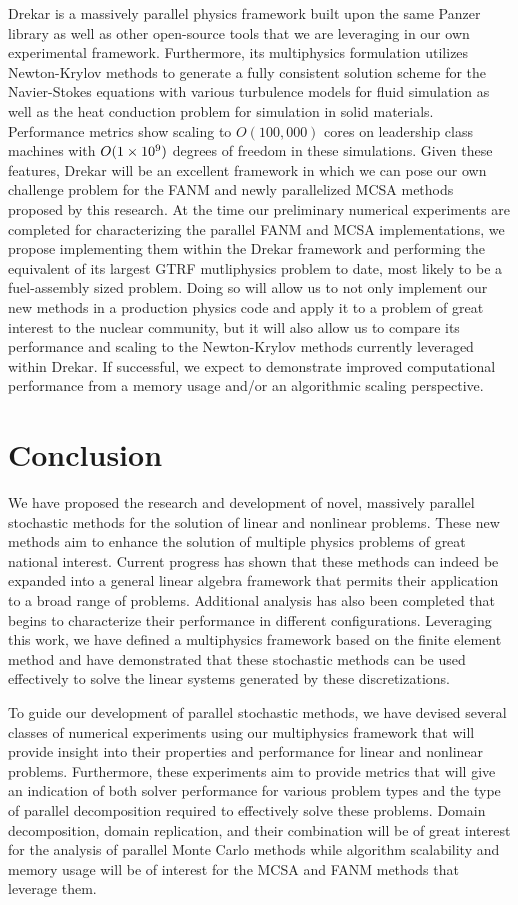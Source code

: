 Drekar is a massively parallel physics framework built upon the same
Panzer library as well as other open-source tools that we are
leveraging in our own experimental framework. Furthermore, its
multiphysics formulation utilizes Newton-Krylov methods to generate a
fully consistent solution scheme for the Navier-Stokes equations with
various turbulence models for fluid simulation as well as the heat
conduction problem for simulation in solid materials. Performance
metrics show scaling to $O(100,000)$ cores on leadership class
machines with $O(1\times 10^{9})$ degrees of freedom in these
simulations. Given these features, Drekar will be an excellent
framework in which we can pose our own challenge problem for the FANM
and newly parallelized MCSA methods proposed by this research. At the
time our preliminary numerical experiments are completed for
characterizing the parallel FANM and MCSA implementations, we propose
implementing them within the Drekar framework and performing the
equivalent of its largest GTRF mutliphysics problem to date, most
likely to be a fuel-assembly sized problem. Doing so will allow us to
not only implement our new methods in a production physics code and
apply it to a problem of great interest to the nuclear community, but
it will also allow us to compare its performance and scaling to the
Newton-Krylov methods currently leveraged within Drekar. If
successful, we expect to demonstrate improved computational
performance from a memory usage and/or an algorithmic scaling
perspective.

\section{Conclusion}
\label{sec:conclusion}
We have proposed the research and development of novel, massively
parallel stochastic methods for the solution of linear and nonlinear
problems. These new methods aim to enhance the solution of multiple
physics problems of great national interest. Current progress has
shown that these methods can indeed be expanded into a general linear
algebra framework that permits their application to a broad range of
problems. Additional analysis has also been completed that begins to
characterize their performance in different configurations. Leveraging
this work, we have defined a multiphysics framework based on the
finite element method and have demonstrated that these stochastic
methods can be used effectively to solve the linear systems generated
by these discretizations.

To guide our development of parallel stochastic methods, we have
devised several classes of numerical experiments using our
multiphysics framework that will provide insight into their properties
and performance for linear and nonlinear problems. Furthermore, these
experiments aim to provide metrics that will give an indication of
both solver performance for various problem types and the type of
parallel decomposition required to effectively solve these
problems. Domain decomposition, domain replication, and their
combination will be of great interest for the analysis of parallel
Monte Carlo methods while algorithm scalability and memory usage will
be of interest for the MCSA and FANM methods that leverage them.

